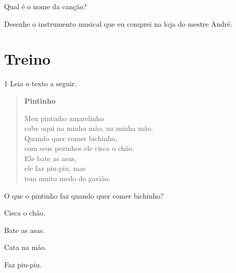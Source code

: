 
\begin{escolha}
\item Qual é o nome da canção?\\

\item Desenhe o instrumento musical que eu comprei na loja do mestre André.

\begin{mdframed}[linewidth=2pt,linecolor=salmao,roundcorner=10pt]
\vspace{3cm}
\end{mdframed}
\end{escolha}

\section*{Treino}

\num{1} Leia o texto a seguir.

\begin{myquote}
\begin{verse}
\textbf{Pintinho}

Meu pintinho amarelinho\\
cabe aqui na minha mão, na minha mão.\\
Quando quer comer bichinho,\\ 
com seus pezinhos ele cisca o chão.\\
Ele bate as asas,\\
ele faz piu-piu, mas\\ 
tem muito medo do gavião.
\end{verse}

\end{myquote}

O que o pintinho faz quando quer comer bichinho?

\begin{escolha}
	\item Cisca o chão.

	\item Bate as asas.

	\item Cata na mão.

	\item Faz piu-piu.
\end{escolha}

